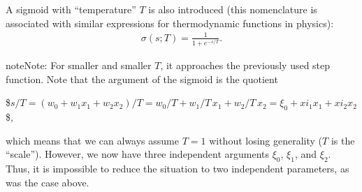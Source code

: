 \documentclass[letterpaper,10pt,english]{jupyterBook}
\begin{document}
\begin{sphinxVerbatim}[commandchars=\\\{\}]
 
      
\end{sphinxVerbatim}

\begin{sphinxVerbatim}[commandchars=\\\{\}]
\end{sphinxVerbatim}

\noindent{}

\sphinxAtStartPar
A sigmoid with “temperature” \( T \) is also introduced (this nomenclature is associated with similar expressions for thermodynamic functions in physics):
\begin{equation*}
\begin{split}\sigma(s;T)=\frac{1}{1+e^{-s/T}}.\end{split}
\end{equation*}
\begin{sphinxVerbatim}[commandchars=\\\{\}]
 
     
\end{sphinxVerbatim}

\noindent{}

\begin{sphinxadmonition}{note}{Note:}
\sphinxAtStartPar
For smaller and smaller \( T \), it approaches the previously used step function. Note that the argument of the sigmoid is the quotient

\sphinxAtStartPar
\$\( s / T = (w_0 + w_1 x_1 + w_2 x_2) / T = w_0 / T + w_1 / T \, x_1 + w_2 / T \, x_2 = \xi_0 + xi_1 x_1 + xi_2 x_2 \)\$,

\sphinxAtStartPar
which means that we can always assume \( T = 1 \) without losing generality (\( T \) is the “scale”). However, we now have three independent arguments \( \xi_0 \), \( \xi_1 \), and \( \xi_2\). Thus, it is impossible to reduce the situation to two independent parameters, as was the case above.
\end{sphinxadmonition}
\end{document}
